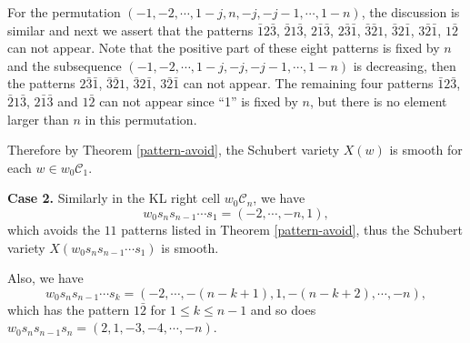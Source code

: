 \documentclass[11pt, reqno]{amsart}
\theoremstyle{definition}
\numberwithin{equation}{section}
\begin{document}
For the permutation $(-1,-2,\cdots,1-j,n,-j,-j-1,\cdots,1-n)$, the discussion is similar and next we assert that the patterns $\bar{1}2\bar{3}$, $\bar{2}1\bar{3}$, $2\bar{1}\bar{3}$, $2\bar{3}\bar{1}$, $\bar{3}\bar{2}1$, $\bar{3}2\bar{1}$, $3\bar{2}\bar{1}$, $1\bar{2}$ can not appear. Note that the positive part of these eight patterns is fixed by $n$ and  the subsequence $(-1,-2,\cdots,1-j,-j,-j-1,\cdots,1-n)$ is decreasing, then the patterns $2\bar{3}\bar{1}$, $\bar{3}\bar{2}1$, $\bar{3}2\bar{1}$, $3\bar{2}\bar{1}$ can not appear. The remaining four patterns $\bar{1}2\bar{3}$, $\bar{2}1\bar{3}$, $2\bar{1}\bar{3}$ and $1\bar{2}$ can not appear since “1” is fixed by $n$, but there is no element larger than $n$ in this permutation. 

Therefore by Theorem \ref{pattern-avoid},  the Schubert variety $X(w)$  is smooth for each $w\in w_0\mathcal{C}_1$.

{\bf Case 2.} Similarly in the KL right cell $w_0\mathcal{C}_n$, we have 
$$w_0s_ns_{n-1}\cdots s_1=(-2,\cdots,-n,1),$$
which avoids the  $11$ patterns listed in Theorem \ref{pattern-avoid}, thus the Schubert variety $X(w_0s_ns_{n-1}\cdots s_1)$ is smooth. 


Also, we have
$$
w_0s_ns_{n-1}\cdots s_k=(-2,\cdots,-(n-k+1),1,-(n-k+2),\cdots,-n),
$$
which has the pattern $1\bar{2}$ for $1\leq k\leq n-1$ and so does $ w_0s_ns_{n-1}s_n=(2,1,-3,-4,\cdots,-n)$.
\end{document}
